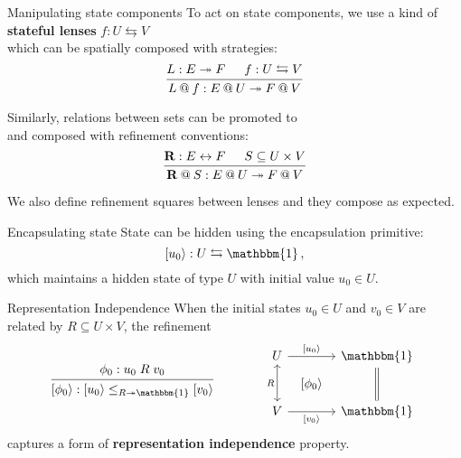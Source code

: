 \documentclass[aspectratio=1610,mathserif]{beamer}
\newcommand{\lensarrow}{\leftrightarrows}
\begin{document}
\begin{frame}{Manipulating state components}
To act on state components,
we use a kind of \textbf{stateful lenses}
$f : U \lensarrow V$ \\
which can be spatially composed with strategies:
\[
  \begin{prooftree}
    \hypo{L : E \twoheadrightarrow F}
    \hypo{f : U \lensarrow V}
    \infer2{L \mathbin@ f : E \mathbin@ U \twoheadrightarrow F \mathbin@ V}
  \end{prooftree}
\]

\pause
Similarly, relations between sets can be promoted to \\
and composed with refinement conventions: \\
\[
  \begin{prooftree}
    \hypo{\mathbf{R} : E \leftrightarrow F}
    \hypo{S \subseteq U \times V}
    \infer2{\mathbf{R} \mathbin@ S : E \mathbin@ U \twoheadrightarrow F \mathbin@ V}
  \end{prooftree}
\]

\pause
We also define refinement squares between lenses and they compose as expected.
\end{frame}

\begin{frame}[fragile]{Encapsulating state}
  State can be hidden using the encapsulation primitive:
  \[
    [u_0\rangle : U \leftrightarrows \mathbbm{1} \,,
  \]
  which maintains a hidden state of type $U$ with initial value $u_0 \in U$.

  \vfill \pause
  \begin{example}
  \end{example}
\end{frame}

\begin{frame}[fragile]{Representation Independence}
  When the initial states $u_0 \in U$ and $v_0 \in V$
  are related by $R \subseteq U \times V$,
  the refinement
  \[
    \begin{prooftree}
      \hypo{\phi_0 : u_0 \mathrel{R} v_0}
      \infer1{[\phi_0\rangle :
         [u_0\rangle \le_{R \twoheadrightarrow \mathbbm{1}}
         [v_0\rangle}
    \end{prooftree}
    \qquad \qquad
    \begin{tikzcd}[sep=tiny]
      U \ar[dd, "R"', leftrightarrow] \ar[rr, "{[u_0\rangle}"] &&
      \mathbbm{1} \ar[dd, equal] \\
      & {[ \phi_0 \rangle} & \\
      V \ar[rr, "{[v_0\rangle}"'] & & \mathbbm{1}
    \end{tikzcd}
  \]
  captures a form of \textbf{representation independence} property.

  \vfill \pause
  \begin{example}
  \end{example}
\end{frame}
\end{document}
